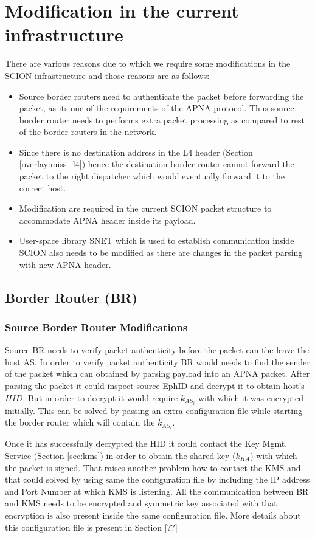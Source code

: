 \section{Modification in the current infrastructure} \label{overlay:modifications}
There are various reasons due to which we require some modifications in the SCION infrastructure and those reasons are as follows:
\begin{itemize}
    \item Source border routers need to authenticate the packet before forwarding the packet, as its one of the requirements of the APNA protocol. Thus source border router needs to performs extra packet processing as compared to rest of the border routers in the network.
    \item Since there is no destination address in the L4 header (Section \ref{overlay:miss_l4}) hence the destination border router cannot forward the packet to the right dispatcher which would eventually forward it to the correct host.
    \item Modification are required in the current SCION packet structure to accommodate APNA header inside its payload.
    \item User-space library SNET which is used to establish communication inside SCION also needs to be modified as there are changes in the packet parsing with new APNA header.
\end{itemize}

\subsection{Border Router (BR)}

\subsubsection{Source Border Router Modifications} \label{overlay:br_src}
Source BR needs to verify packet authenticity before the packet can the leave the host AS. In order to verify packet authenticity BR would needs to find the sender of the packet which can obtained by parsing payload into an APNA packet. After parsing the packet it could inspect source EphID and decrypt it to obtain host's $HID$. But in order to decrypt it would require $k_{AS_{i}}$ with which it was encrypted initially. This can be solved by passing an extra configuration file while starting the border router which will contain the $k_{AS_{i}}$.

Once it has successfully decrypted the HID it could contact the Key Mgmt. Service (Section \ref{sec:kms}) in order to obtain the shared key ($k_{HA}$) with which the packet is signed. That raises another problem how to contact the KMS and that could solved by using same the configuration file by including the IP address and Port Number at which KMS is listening. All the communication between BR and KMS needs to be encrypted and symmetric key associated with that encryption is also present inside the same configuration file. More details about this configuration file is present in Section [??]

